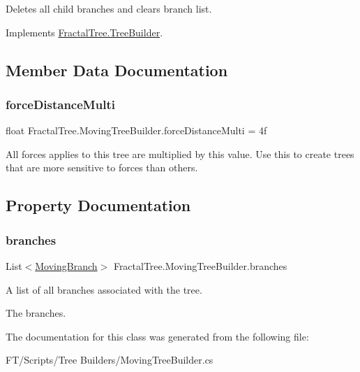 Deletes all child branches and clears branch list. 



Implements \hyperlink{class_fractal_tree_1_1_tree_builder}{Fractal\+Tree.\+Tree\+Builder}.



\subsection{Member Data Documentation}
\mbox{\label{class_fractal_tree_1_1_moving_tree_builder_a43a9108048a9be7582ba79ed110fff9d}} 
\subsubsection{\texorpdfstring{force\+Distance\+Multi}{forceDistanceMulti}}
{\footnotesize\ttfamily float Fractal\+Tree.\+Moving\+Tree\+Builder.\+force\+Distance\+Multi = 4f}



All forces applies to this tree are multiplied by this value. Use this to create trees that are more sensitive to forces than others. 



\subsection{Property Documentation}
\mbox{\label{class_fractal_tree_1_1_moving_tree_builder_aca75f30f0c8170efd0b62eca6eee9e00}} 
\subsubsection{\texorpdfstring{branches}{branches}}
{\footnotesize\ttfamily List$<$\hyperlink{interface_fractal_tree_1_1_moving_branch}{Moving\+Branch}$>$ Fractal\+Tree.\+Moving\+Tree\+Builder.\+branches\hspace{0.3cm}{\ttfamily [get]}}



A list of all branches associated with the tree. 

The branches.

The documentation for this class was generated from the following file\+:\begin{DoxyCompactItemize}
\item 
F\+T/\+Scripts/\+Tree Builders/Moving\+Tree\+Builder.\+cs\end{DoxyCompactItemize}

